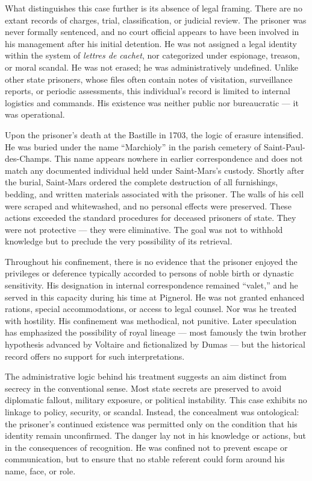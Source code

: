 What distinguishes this case further is its absence of legal framing. There are no extant records of charges, trial, classification, or judicial review. The prisoner was never formally sentenced, and no court official appears to have been involved in his management after his initial detention. He was not assigned a legal identity within the system of \textit{lettres de cachet}, nor categorized under espionage, treason, or moral scandal. He was not erased; he was administratively undefined. Unlike other state prisoners, whose files often contain notes of visitation, surveillance reports, or periodic assessments, this individual’s record is limited to internal logistics and commands. His existence was neither public nor bureaucratic — it was operational.

Upon the prisoner’s death at the Bastille in 1703, the logic of erasure intensified. He was buried under the name “Marchioly” in the parish cemetery of Saint-Paul-des-Champs. This name appears nowhere in earlier correspondence and does not match any documented individual held under Saint-Mars’s custody. Shortly after the burial, Saint-Mars ordered the complete destruction of all furnishings, bedding, and written materials associated with the prisoner. The walls of his cell were scraped and whitewashed, and no personal effects were preserved. These actions exceeded the standard procedures for deceased prisoners of state. They were not protective — they were eliminative. The goal was not to withhold knowledge but to preclude the very possibility of its retrieval.

Throughout his confinement, there is no evidence that the prisoner enjoyed the privileges or deference typically accorded to persons of noble birth or dynastic sensitivity. His designation in internal correspondence remained “valet,” and he served in this capacity during his time at Pignerol. He was not granted enhanced rations, special accommodations, or access to legal counsel. Nor was he treated with hostility. His confinement was methodical, not punitive. Later speculation has emphasized the possibility of royal lineage — most famously the twin brother hypothesis advanced by Voltaire and fictionalized by Dumas — but the historical record offers no support for such interpretations.

The administrative logic behind his treatment suggests an aim distinct from secrecy in the conventional sense. Most state secrets are preserved to avoid diplomatic fallout, military exposure, or political instability. This case exhibits no linkage to policy, security, or scandal. Instead, the concealment was ontological: the prisoner’s continued existence was permitted only on the condition that his identity remain unconfirmed. The danger lay not in his knowledge or actions, but in the consequences of recognition. He was confined not to prevent escape or communication, but to ensure that no stable referent could form around his name, face, or role.

